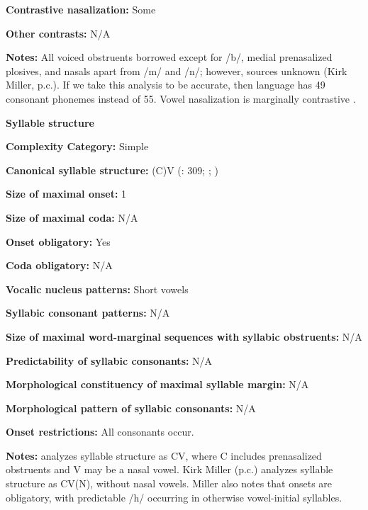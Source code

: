 \textbf{Contrastive nasalization:} Some



\textbf{Other contrasts:} N/A



\textbf{Notes:} All voiced obstruents borrowed except for /b/, medial prenasalized plosives, and nasals apart from /m/ and /n/; however, sources unknown (Kirk Miller, p.c.). If we take this analysis to be accurate, then language has 49 consonant phonemes instead of 55. Vowel nasalization is marginally contrastive \citep[38]{Sands2013}.



\textbf{Syllable structure}



\textbf{Complexity Category:} Simple



\textbf{Canonical syllable structure:} (C)V (\citealt{TuckerEtAl1977}: 309; \citealt{SandsEtAl1996}; \citealt{Sands2013})



\textbf{Size of maximal onset:} 1



\textbf{Size of maximal coda:} N/A



\textbf{Onset obligatory:} Yes



\textbf{Coda obligatory:} N/A



\textbf{Vocalic nucleus patterns:} Short vowels



\textbf{Syllabic consonant patterns:} N/A



\textbf{Size of maximal word{}-marginal sequences with syllabic obstruents:} N/A



\textbf{Predictability of syllabic consonants:} N/A



\textbf{Morphological constituency of maximal syllable margin:} N/A



\textbf{Morphological pattern of syllabic consonants:} N/A



\textbf{Onset restrictions:} All consonants occur.



\textbf{Notes:} \citet{Sands2013} analyzes syllable structure as CV, where C includes prenasalized obstruents and V may be a nasal vowel. Kirk Miller (p.c.) analyzes syllable structure as CV(N), without nasal vowels. Miller also notes that onsets are obligatory, with predictable /h/ occurring in otherwise vowel-initial syllables.



